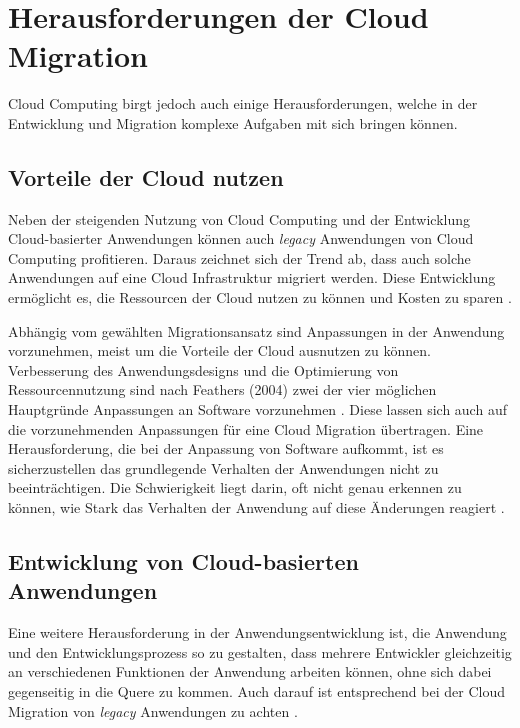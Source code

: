 \section{Herausforderungen der Cloud Migration}
\label{sec:herausforderungen}


Cloud Computing birgt jedoch auch einige Herausforderungen, welche in der Entwicklung und Migration komplexe Aufgaben mit sich bringen können.

\subsection{Vorteile der Cloud nutzen}

Neben der steigenden Nutzung von Cloud Computing und der Entwicklung Cloud-basierter Anwendungen können auch \textit{legacy} Anwendungen von Cloud Computing profitieren. Daraus zeichnet sich der Trend ab, dass auch solche Anwendungen auf eine Cloud Infrastruktur migriert werden. Diese Entwicklung ermöglicht es, die Ressourcen der Cloud nutzen zu können und Kosten zu sparen \cite[Vgl.][S. 31]{Maenhaut2016}.

Abhängig vom gewählten Migrationsansatz sind Anpassungen in der Anwendung vorzunehmen, meist um die Vorteile der Cloud ausnutzen zu können. Verbesserung des Anwendungsdesigns und die Optimierung von Ressourcennutzung sind nach Feathers (2004) zwei der vier möglichen Hauptgründe Anpassungen an Software vorzunehmen \cite[Vgl.][S. 3]{Feathers2004}. Diese lassen sich auch auf die vorzunehmenden Anpassungen für eine Cloud Migration übertragen. Eine Herausforderung, die bei der Anpassung von Software aufkommt, ist es sicherzustellen das grundlegende Verhalten der Anwendungen nicht zu beeinträchtigen. Die Schwierigkeit liegt darin, oft nicht genau erkennen zu können, wie Stark das Verhalten der Anwendung auf diese Änderungen reagiert \cite[Vgl.][S. 7]{Feathers2004}. 

\subsection{Entwicklung von Cloud-basierten Anwendungen}

Eine weitere Herausforderung in der Anwendungsentwicklung ist, die Anwendung und den Entwicklungsprozess so zu gestalten, dass mehrere Entwickler gleichzeitig an verschiedenen Funktionen der Anwendung arbeiten können, ohne sich dabei gegenseitig in die Quere zu kommen. Auch darauf ist entsprechend bei der Cloud Migration von \textit{legacy} Anwendungen zu achten \cite[Vgl.][]{Ibryam2021}.

